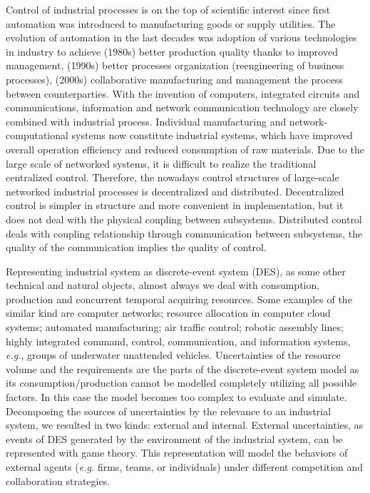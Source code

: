 \documentclass[conference]{IEEEtran}
\begin{document}
Control of industrial processes is on the top of scientific interest since first automation was introduced to manufacturing goods or supply utilities. The evolution of automation in the last decades was adoption of various technologies in industry to achieve (1980s) better production quality thanks to improved management, (1990s) better processes organization (reengineering of business processes), (2000s) collaborative manufacturing and management the process between counterparties. With the invention of computers, integrated circuits and communications, information and network communication technology are closely combined with industrial process. Individual manufacturing and network-computational systems now constitute industrial systems, which have improved overall operation efficiency and reduced consumption of raw materials. Due to the large scale of networked systems, it is difficult to realize the traditional centralized control. Therefore, the nowadays control structures of large-scale networked industrial processes is decentralized and distributed. Decentralized control is simpler in structure and more convenient in implementation, but it does not deal with the physical coupling between subsystems. Distributed control deals with coupling relationship through communication between subsystems, the quality of the communication implies the quality of control.


Representing industrial system as discrete-event system (DES), as some other technical and natural objects, almost always we deal with consumption, production and concurrent temporal acquiring resources. Some examples of the similar kind are computer networks; resource allocation in computer cloud systems; automated manufacturing; air traffic control; robotic assembly lines; highly integrated command, control, communication, and information systems, \emph{e.g.}, groups of underwater unattended vehicles.  Uncertainties of the resource volume and the requirements are the parts of the discrete-event system model as its consumption/production cannot be modelled completely utilizing all possible factors. In this case the model becomes too complex to evaluate and simulate. Decomposing the sources of uncertainties by the relevance to an industrial system, we resulted in two kinds: external and internal.  External uncertainties, as events of DES generated by the environment of the industrial system, can be represented with game theory.  This representation will model the behaviors of external agents (\emph{e.g.} firms, teams, or individuals) under different competition and collaboration strategies.
\end{document}
